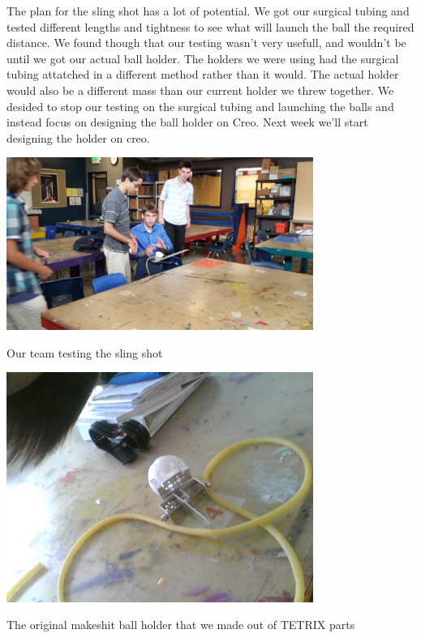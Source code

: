 The plan for the sling shot has a lot of potential. We got our surgical tubing and tested different lengths and tightness to see what will launch the ball the required distance. We found though that our testing wasn't very usefull, and wouldn't be until we got our actual ball holder. The holders we were using had the surgical tubing attatched in a different method rather than it would. The actual holder would also be a different mass than our current holder we threw together. We desided to stop our testing on the surgical tubing and launching the balls and instead focus on designing the ball holder on Creo. Next week we'll start designing the holder on creo. 

\begin{center}
 \includegraphics[width=10cm]{./Entries/Images/SlingShotTesting.jpg}
 \end{center}

Our team testing the sling shot

\begin{center}
 \includegraphics[width=10cm]{./Entries/Images/BallHolder.jpg}
 \end{center}

The original makeshit ball holder that we made out of TETRIX parts


